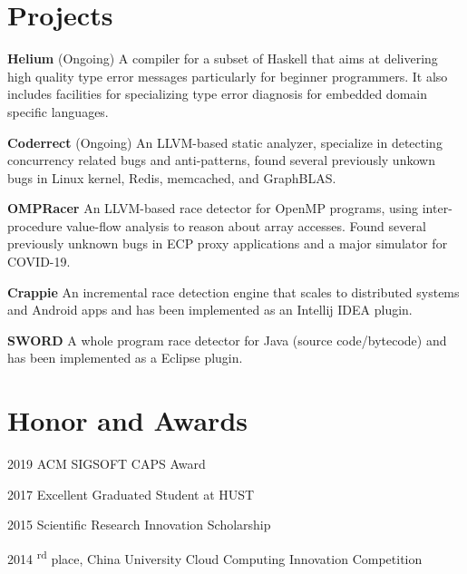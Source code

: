 \documentclass[12pt,letterpaper]{report}
\newcommand{\listtabwidth}{1.75cm}
\begin{document}
\vspace{-0.5em}

\renewcommand{\listtabwidth}{2.5cm}
	\section*{Projects}
	
	\begin{tablist}
		\item[\textbf{Helium}]
		\tab (Ongoing) A compiler for a subset of Haskell that aims at delivering high quality type error messages particularly for beginner programmers. It also includes facilities for specializing type error diagnosis for embedded domain specific languages.
		\item[\textbf{Coderrect}]
		\tab (Ongoing) An LLVM-based static analyzer, specialize in detecting concurrency related bugs and anti-patterns, found several previously unkown bugs in Linux kernel, Redis, memcached, and GraphBLAS.
		\item[\textbf{OMPRacer}] 
		\tab An LLVM-based race detector for OpenMP programs, 
		using inter-procedure value-flow analysis to reason about array accesses.
		Found several previously unknown bugs in ECP proxy applications and a major simulator for COVID-19.
		\item[\textbf{Crappie}] 
		\tab An incremental race detection engine that scales to distributed systems and Android apps and has been implemented as an Intellij IDEA plugin.
		\item[\textbf{SWORD}] 
		\tab A whole program race detector for Java (source code/bytecode) and has been implemented as a Eclipse plugin.
	\end{tablist}
\renewcommand{\listtabwidth}{1.75cm}

\vspace{-0.5em}
\section*{Honor and Awards}

\begin{tablist}
	\item[2019] \tab ACM SIGSOFT CAPS Award
	\item[2017] \tab Excellent Graduated Student at HUST
	\item[2015] \tab Scientific Research Innovation Scholarship
	\item[2014] \textsuperscript{rd} place, China University Cloud Computing Innovation Competition
\end{tablist}
\end{document}

